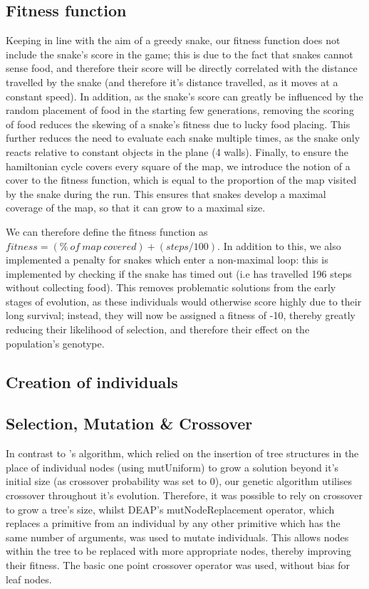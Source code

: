 \documentclass[british,10pt,a4paper]{article}
\begin{document}
\subsection{Fitness function}
\label{subsec:fitness_func}
Keeping in line with the aim of a greedy snake, our fitness function does not include the snake's score in the game; this is due to the fact that snakes cannot sense food, and therefore their score will be directly correlated with the distance travelled by the snake (and therefore it's distance travelled, as it moves at a constant speed). In addition, as the snake's score can greatly be influenced by the random placement of food in the starting few generations, removing the scoring of food reduces the skewing of a snake's fitness due to lucky food placing. This further reduces the need to evaluate each snake multiple times, as the snake only reacts relative to constant objects in the plane (4 walls). Finally, to ensure the hamiltonian cycle covers every square of the map, we introduce the notion of a cover to the fitness function, which is equal to the proportion of the map visited by the snake during the run. This ensures that snakes develop a maximal coverage of the map, so that it can grow to a maximal size. \newline

We can therefore define the fitness function as \(fitness= (\% \ of\ map\ covered) + (steps/100)\). \newline
In addition to this, we also implemented a penalty for snakes which enter a non-maximal loop: this is implemented by checking if the snake has timed out (i.e has travelled 196 steps without collecting food). This removes problematic solutions from the early stages of evolution, as these individuals would otherwise score highly due to their long survival; instead, they will now be assigned a fitness of -10, thereby greatly reducing their likelihood of selection, and therefore their effect on the population's genotype.

\subsection{Creation of individuals}
\subsection{Selection, Mutation \& Crossover}
In contrast to \citeauthor{Ehlis2000-sz}'s algorithm, which relied on the insertion of tree structures in the place of individual nodes (using mutUniform)  to grow a solution beyond it's initial size (as crossover probability was set to 0), our genetic algorithm utilises crossover throughout it's evolution. Therefore, it was possible to rely on crossover to grow a tree's size, whilst DEAP's mutNodeReplacement operator, which replaces a primitive from an individual by any other primitive which has the same number of arguments, was used to mutate individuals. This allows nodes within the tree to be replaced with more appropriate nodes, thereby improving their fitness. The basic one point crossover operator was used, without bias for leaf nodes. \newline
\end{document}
